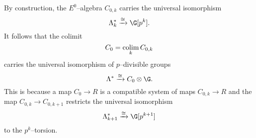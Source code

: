 By construction, the \(E^0\)--algebra \(C_{0,k}\) carries the universal isomorphism
\[
\Lk^* \xrightarrow{\cong} \G[p^k].
\]
It follows that the colimit \[C_0 = \operatorname*{colim}_{k} C_{0,k}\] carries the universal isomorphism of \(p\)--divisible groups
\[
\Lambda^* \xrightarrow{\cong} C_0 \otimes \G.
\]
This is because a map \(C_0 \rightarrow R\) is a compatible system of maps \(C_{0,k} \rightarrow R\) and the map \(C_{0,k} \rightarrow C_{0,k+1}\) restricts the universal isomorphism
\[
\Lambda_{k+1}^{*} \xrightarrow{\cong} \G[p^{k+1}]
\]
to the \(p^k\)--torsion.
%
%




